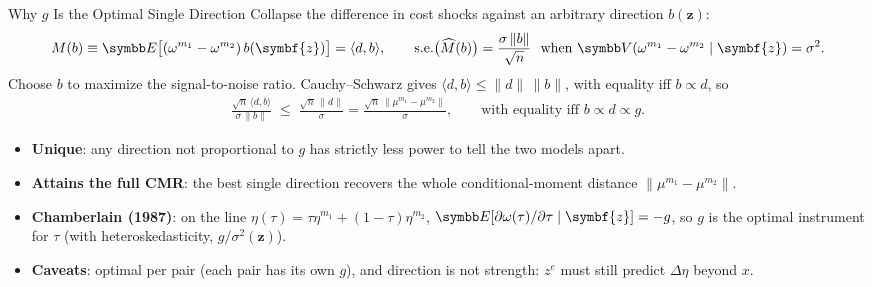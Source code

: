\documentclass[aspectratio=169,10pt]{beamer}
\begin{document}
\begin{frame}{Why $g$ Is the Optimal Single Direction}
\small
Collapse the difference in cost shocks against an arbitrary direction $b(\symbf{z})$:
\begin{align*}
M(b) \equiv \E\big[(\omega^{m_1} - \omega^{m_2})\, b(\symbf{z})\big] = \langle d, b \rangle,
\qquad
\text{s.e.}\big(\widehat M(b)\big) = \frac{\sigma\, \|b\|}{\sqrt n} \ \text{ when } \Var(\omega^{m_1} - \omega^{m_2} \mid \symbf{z}) = \sigma^2 .
\end{align*}
Choose $b$ to maximize the signal-to-noise ratio. Cauchy--Schwarz gives $\langle d, b \rangle \leq \|d\|\, \|b\|$, with equality iff $b \propto d$, so
\begin{align*}
\frac{\sqrt{n}\, \langle d, b \rangle}{\sigma\, \|b\|} \;\leq\; \frac{\sqrt{n}\, \|d\|}{\sigma} = \frac{\sqrt{n}\, \|\mu^{m_1} - \mu^{m_2}\|}{\sigma},
\qquad \text{with equality iff } b \propto d \propto g .
\end{align*}
\begin{itemize}
\item \textbf{Unique}: any direction not proportional to $g$ has strictly less power to tell the two models apart.
\item \textbf{Attains the full CMR}: the best single direction recovers the whole conditional-moment distance $\|\mu^{m_1} - \mu^{m_2}\|$.
\item \textbf{Chamberlain (1987)}: on the line $\eta(\tau) = \tau\eta^{m_1} + (1-\tau)\eta^{m_2}$, $\E[\partial\omega(\tau)/\partial\tau \mid \symbf{z}] = -g$, so $g$ is the optimal instrument for $\tau$ (with heteroskedasticity, $g/\sigma^2(\symbf{z})$).
\item \textbf{Caveats}: optimal \alert{per pair} (each pair has its own $g$), and direction is not strength: $z^e$ must still predict $\Delta\eta$ beyond $x$.
\end{itemize}
\end{frame}
\end{document}
